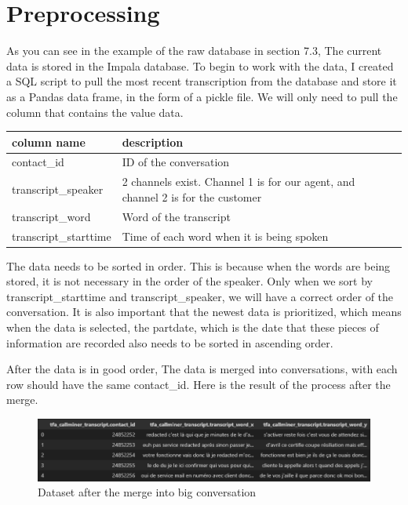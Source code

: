 \section{Preprocessing}

As you can see in the example of the raw database in section 7.3, The current data is stored in the Impala database. To begin to work with the data, I created a SQL script to pull the most recent transcription from the database and store it as a Pandas data frame, in the form of a pickle file. We will only need to pull the column that contains the value data.

\begin{table}[H]
\centering
{} \label{tab:description_database} 
\begin{tabular}{|lp{10cm}|lp{10cm}|}
\hline
\textbf{column name}  & \textbf{description}                                                                  \\ \hline
contact\_id           & ID of the conversation                                                                \\ \hline
transcript\_speaker   & 2 channels exist. Channel 1 is for our agent, and channel 2 is for the customer \\ \hline
transcript\_word      & Word of the transcript                                                                \\ \hline
transcript\_starttime & Time of each word when it is being spoken                                             \\ \hline
\end{tabular}
\end{table}

The data needs to be sorted in order. This is because when the words are being stored, it is not necessary in the order of the speaker. Only when we sort by transcript\_starttime and transcript\_speaker, we will have a correct order of the conversation. It is also important that the newest data is prioritized, which means when the data is selected, the partdate, which is the date that these pieces of information are recorded also needs to be sorted in ascending order.

After the data is in good order, The data is merged into conversations, with each row should have the same contact\_id. Here is the result of the process after the merge.

\begin{figure}[H]
    \centering
    \includegraphics[width=1\textwidth]{images/dataset_merged_example.png}
    \caption{Dataset after the merge into big conversation}
    \label{fig:dataset_merge}
\end{figure}


